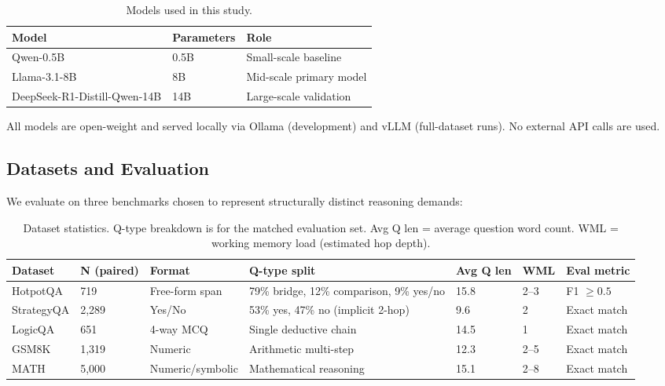 \documentclass{article}
\begin{document}
\begin{table}[h]
\centering
\caption{Models used in this study.}
\label{tab:models}
\begin{tabular}{lll}
\toprule
Model & Parameters & Role \\
\midrule
Qwen-0.5B & 0.5B & Small-scale baseline \\
Llama-3.1-8B & 8B & Mid-scale primary model \\
DeepSeek-R1-Distill-Qwen-14B & 14B & Large-scale validation \\
\bottomrule
\end{tabular}
\end{table}

All models are open-weight and served locally via Ollama (development) and vLLM (full-dataset runs). No external API calls are used.

\subsection{Datasets and Evaluation}
\label{sec:datasets}

We evaluate on three benchmarks chosen to represent structurally distinct reasoning demands:

\begin{table}[h]
\centering
\caption{Dataset statistics. Q-type breakdown is for the matched evaluation set. Avg Q len = average question word count. WML = working memory load (estimated hop depth).}
\label{tab:datasets}
\small
\begin{tabular}{lllllll}
\toprule
Dataset & N (paired) & Format & Q-type split & Avg Q len & WML & Eval metric \\
\midrule
HotpotQA   & 719  & Free-form span & 79\% bridge, 12\% comparison, 9\% yes/no & 15.8 & 2--3 & F1 $\geq0.5$ \\
StrategyQA & 2,289 & Yes/No       & 53\% yes, 47\% no (implicit 2-hop)        &  9.6 & 2   & Exact match \\
LogicQA    & 651  & 4-way MCQ      & Single deductive chain                    & 14.5 & 1   & Exact match \\
GSM8K      & 1,319 & Numeric      & Arithmetic multi-step                     & 12.3 & 2--5 & Exact match \\
MATH       & 5,000 & Numeric/symbolic & Mathematical reasoning                & 15.1 & 2--8 & Exact match \\
\bottomrule
\end{tabular}
\end{table}
\end{document}
